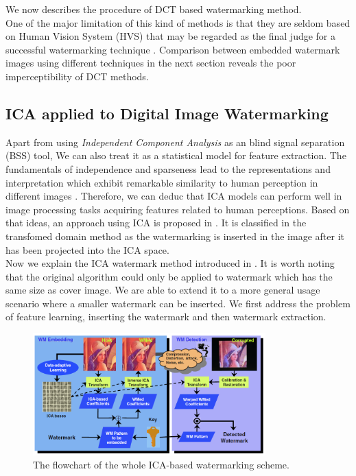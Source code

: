 We now describes the procedure of DCT based watermarking method.\\

One of the major limitation of this kind of methods is that they are seldom based on Human Vision System (HVS) that may be regarded as the final judge for a successful watermarking technique \cite{LuWei_ICA}. Comparison between embedded watermark images using different techniques in the next section reveals the poor imperceptibility of DCT methods.

\subsection{ICA applied to Digital Image Watermarking}
Apart from using \textit{Independent Component Analysis} as an blind signal separation (BSS) tool, We can also treat it as a statistical model for feature extraction. The fundamentals of independence and sparseness lead to the representations and interpretation which exhibit remarkable similarity to human perception in different images \cite{BELL19973327}. Therefore, we can deduc that ICA
models can perform well in image processing tasks acquiring features related to human perceptions. Based on that ideas, an approach using ICA is proposed in \cite{inproceedingsICA_watermark}. It is classified in the transfomed domain method as the watermarking is inserted in the image after it has been projected into the ICA space. \\

Now we explain the ICA watermark method introduced in \cite{inproceedingsICA_watermark}. It is worth noting that the original algorithm could only be applied to watermark which has the same size as cover image. We are able to extend it to a more general usage scenario where a smaller watermark can be inserted. We first address the problem of feature learning, inserting the watermark and then watermark extraction.

\begin{figure}[H]
\centering
\includegraphics[width=0.8\textwidth]{images/ICA_flowchart.PNG}
\caption{The flowchart of the whole ICA-based watermarking scheme. \cite{LuWei_ICA}}
\label{flow_ICA}
\end{figure}


